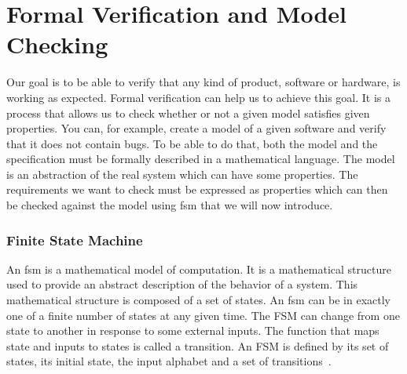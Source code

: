 \documentclass[12pt]{article}
\theoremstyle{definition}
\theoremstyle{definition}
\theoremstyle{remark}
\begin{document}

\clearpage
\part{Formal Verification and Model Checking}\label{ModelChecking}

Our goal is to be able to verify that any kind of product, software or hardware, is working as expected. Formal verification can help us to achieve this goal. It is a process that allows us to check whether or not a given model satisfies given properties. You can, for example, create a model of a given software and verify that it does not contain bugs. To be able to do that, both the model and the specification must be formally described in a mathematical language. The model is an abstraction of the real system which can have some properties. The requirements we want to check must be expressed as properties which can then be checked against the model using \gls{fsm} that we will now introduce.\\


\clearpage



\section{Finite State Machine}


An \gls{fsm} is a mathematical model of computation. It is a mathematical structure used to provide an abstract description of the behavior of a system. This mathematical structure is composed of a set of states. An \gls{fsm} can be in exactly one of a finite number of states at any given time. The FSM can change from one state to another in response to some external inputs. The function that maps state and inputs to states is called a transition. An FSM is defined by its set of states, its initial state, the input alphabet and a set of transitions~\cite{FSM:2017}.\\
\end{document}
